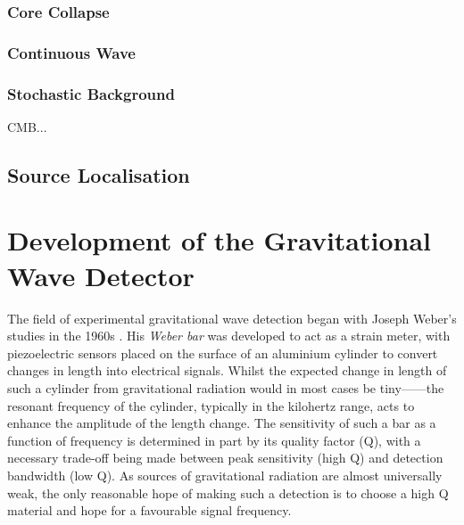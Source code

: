 
\subsubsection{Core Collapse}

\subsubsection{Continuous Wave}

\subsubsection{Stochastic Background}
CMB...


\subsection{Source Localisation}

\section{Development of the Gravitational Wave Detector}
The field of experimental gravitational wave detection began with Joseph Weber's studies in the 1960s \cite{Weber1960}. His \emph{Weber bar} was developed to act as a strain meter, with piezoelectric sensors placed on the surface of an aluminium cylinder to convert changes in length into electrical signals. Whilst the expected change in length of such a cylinder from gravitational radiation would in most cases be tiny------the resonant frequency of the cylinder, typically in the kilohertz range, acts to enhance the amplitude of the length change. The sensitivity of such a bar as a function of frequency is determined in part by its quality factor (Q), with a necessary trade-off being made between peak sensitivity (high Q) and detection bandwidth (low Q). As sources of gravitational radiation are almost universally weak, the only reasonable hope of making such a detection is to choose a high Q material and hope for a favourable signal frequency.

